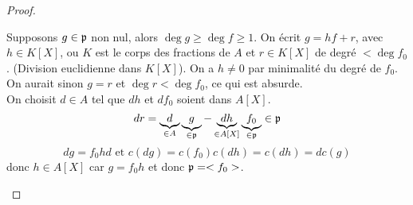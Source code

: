 \begin{proof}
\begin{itemize}
		      Supposons $g \in \mathfrak{p}$ non nul, alors $ \deg g \geq \deg f \geq 1$.
		      On écrit $g = hf + r$, avec $h \in K[X]$, ou $K$ est le corps des fractions de $A$ et $r \in K[X]$ de degré $< \deg f_0$.
		      (Division euclidienne dans $K[X]$).
		      On a $h \neq 0$ par minimalité du degré de $f_0$. On aurait sinon
		      $g = r$ et $\deg r < \deg f_0$, ce qui est absurde.\\
		      On choisit $d \in A$ tel que $dh$ et $df_0$ soient dans $A[X]$.\\
		      $$ dr = \underbrace{d}_{\in A} \underbrace{g}_{\in \mathfrak{p}} - \underbrace{dh}_{\in A[X]} \underbrace{f_0}_{\in \mathfrak{p}} \in \mathfrak{p}$$
		      $$ dg =f_0hd \text{ et } c(dg) = c(f_0)c(dh) = c(dh) = dc(g)$$
		      donc $h \in A[X]$ car $g = f_0h$ et donc $\mathfrak{p} = <f_0>$.
	\end{itemize}
\end{proof}


